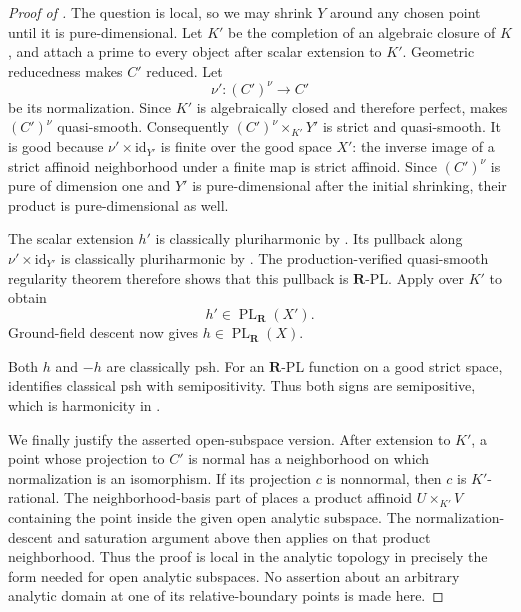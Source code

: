\begin{proof}[Proof of ]
The question is local, so we may shrink \(Y\) around any chosen point
until it is pure-dimensional.  Let \(K'\) be the completion of an
algebraic closure of \(K\), and attach a prime to every object after
scalar extension to \(K'\).  Geometric reducedness makes \(C'\) reduced.
Let
\[
                            \nu':(C')^\nu\longrightarrow C'
\]
be its normalization.  Since \(K'\) is algebraically closed and
therefore perfect, \cite[Lemma~3.9(1)]{GR25Classical} makes
\((C')^\nu\) quasi-smooth.  Consequently
\((C')^\nu\times_{K'}Y'\) is strict and quasi-smooth.  It is good because
\(\nu'\times\mathrm{id}_{Y'}\) is finite over the good space \(X'\):
the inverse image of a strict affinoid neighborhood under a finite map
is strict affinoid.  Since \((C')^\nu\) is pure of dimension one and
\(Y'\) is pure-dimensional after the initial shrinking, their product is
pure-dimensional as well.

The scalar extension \(h'\) is classically pluriharmonic by
\cite[Proposition~7.2(6)]{GR25Classical}.  Its pullback along
\(\nu'\times\mathrm{id}_{Y'}\) is classically pluriharmonic by
\cite[Proposition~7.2(7)]{GR25Classical}.  The production-verified
quasi-smooth regularity theorem
 therefore shows that this pullback is
\(\mathbf R\)-PL.  Apply
 over \(K'\) to
obtain
\[
                              h'\in\operatorname{PL}_{\mathbf R}(X').
\]
Ground-field descent \cite[Corollary~5.12]{GJR26} now gives
\(h\in\operatorname{PL}_{\mathbf R}(X)\).

Both \(h\) and \(-h\) are classically psh.  For an \(\mathbf R\)-PL
function on a good strict space, \cite[Theorem~4.3]{GR25Classical}
identifies classical psh with semipositivity.  Thus both signs are
semipositive, which is harmonicity in
\cite[Definition~7.2]{GJR26}.

We finally justify the asserted open-subspace version.  After extension
to \(K'\), a point whose projection to \(C'\) is normal has a neighborhood
on which normalization is an isomorphism.  If its projection \(c\) is
nonnormal, then \(c\) is \(K'\)-rational.  The neighborhood-basis part of
 places a product affinoid
\(U\times_{K'}V\) containing the point inside the given open analytic
subspace.  The normalization-descent and saturation argument above then
applies on that product neighborhood.  Thus the proof is local in the
analytic topology in precisely the form needed for open analytic
subspaces.  No assertion about an arbitrary analytic domain at one of its
relative-boundary points is made here.
\end{proof}

